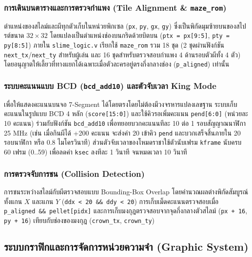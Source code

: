 \documentclass[12pt,a4paper]{article}
\begin{document}
\subsubsection{การเดินบนตารางและการตรวจกำแพง (Tile Alignment \& \texttt{maze\_rom})}

ตำแหน่งของสไลม์และผีทุกตัวเก็บในหน่วยพิกเซล (\texttt{px}, \texttt{py}, \texttt{gx}, \texttt{gy}) ซึ่งเป็นพิกัดมุมซ้ายบนของสไปรต์ขนาด $32\times32$ โดยแปลงเป็นตำแหน่งช่องบนกริดด้วยบิตบน (\texttt{ptx = px[9:5]}, \texttt{pty = py[8:5]}) ภายใน \texttt{slime\_logic.v} เรียกใช้ \texttt{maze\_rom} รวม 18 ชุด (2 ชุดผ่านฟังก์ชัน \texttt{next\_tx}/\texttt{next\_ty} สำหรับผู้เล่น และ 16 ชุดสำหรับตรวจสอบกำแพง 4 ด้านรอบตัวผีทั้ง 4 ตัว) โดยอนุญาตให้เลี้ยวที่ทางแยกได้เฉพาะเมื่อตัวละครอยู่ตรงกึ่งกลางช่อง (\texttt{p\_aligned}) เท่านั้น

\subsubsection{ระบบคะแนนแบบ BCD (\texttt{bcd\_add10}) และตัวจับเวลา King Mode}

เพื่อให้แสดงคะแนนบนจอ 7-Segment ได้โดยตรงโดยไม่ต้องมีวงจรหารแปลงเลขฐาน ระบบเก็บคะแนนในรูปแบบ BCD 4 หลัก (\texttt{score[15:0]}) และใช้คิวรอเพิ่มคะแนน \texttt{pend[6:0]} (หน่วยละ 10 คะแนน) ร่วมกับฟังก์ชัน \texttt{bcd\_add10} เพื่อทยอยบวกคะแนนทีละ 10 ต่อ 1 รอบสัญญาณนาฬิกา 25 MHz (เช่น เมื่อกินผีได้ +200 คะแนน จะส่งค่า 20 เข้าคิว \texttt{pend} และบวกเสร็จสิ้นภายใน 20 รอบนาฬิกา หรือ 0.8 ไมโครวินาที) ส่วนตัวจับเวลาของโหมดราชาใช้ตัวนับเฟรม \texttt{kframe} นับครบ 60 เฟรม (0..59) เพื่อลดค่า \texttt{ksec} ลงทีละ 1 วินาที จนหมดเวลา 10 วินาที

\subsubsection{การตรวจจับการชน (Collision Detection)}

การชนระหว่างสไลม์กับผีตรวจสอบแบบ Bounding-Box Overlap โดยคำนวณผลต่างพิกัดสัมบูรณ์ทั้งแกน $X$ และแกน $Y$ (\texttt{ddx < 20 \&\& ddy < 20}) การเก็บเม็ดคะแนนตรวจสอบเมื่อ \texttt{p\_aligned \&\& pellet[pidx]} และการเก็บมงกุฎตรวจสอบจากจุดกึ่งกลางตัวสไลม์ (\texttt{px + 16}, \texttt{py + 16}) เทียบกับช่องของมงกุฎ (\texttt{crown\_tx}, \texttt{crown\_ty})

\subsection{ระบบกราฟิกและการจัดการหน่วยความจำ (Graphic System)}
\end{document}
